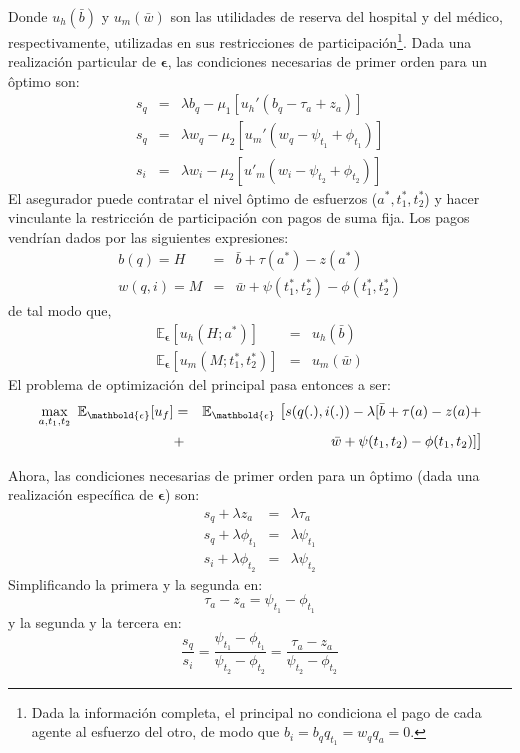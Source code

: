 ﻿\documentclass[12pt,letterpaper]{article}
\begin{document}
Donde $ u_h(\bar{b}) $ y $ u_m(\bar{w}) $ son las utilidades de reserva del hospital y del m\'edico, respectivamente, utilizadas en sus restricciones de participaci\'on\footnote{Dada la informaci\'on completa, el principal no condiciona el pago de cada agente al esfuerzo del otro, de modo que $b_i=b_qq_{t_1}=w_qq_a=0 $.}. Dada una realizaci\'on particular de $ \mathbold{\epsilon} $, las condiciones necesarias de primer orden para un \^optimo son:
\begin{eqnarray*}
  s_q &=& \lambda b_q-\mu_1[u_h'(b_q-\tau_a+z_a)]\\
  s_q&=&
\lambda w_q-\mu_2[u_m'(w_q-\psi_{t_1}+\phi_{t_1})]\\
  s_i &=& \lambda w_i-\mu_2[u'_m(w_i-\psi_{t_2}+\phi_{t_2})]
\end{eqnarray*}
El asegurador puede contratar el nivel \^optimo de esfuerzos ($ a^*,t^*_1,t^*_2$) y hacer vinculante la restricci\'on de participaci\'on con pagos de suma fija. Los pagos vendr\'ian dados por las siguientes expresiones:
\begin{eqnarray*}
b(q)= H &=& \bar{b}+\tau(a^*)-z(a^*)\\
w(q,i)=  M&=& \bar{w}+\psi(t_1^*,t_2^*)-\phi(t_1^*,t_2^*)
\end{eqnarray*}
de tal modo que,
\begin{eqnarray*}
\mathbb{E}_{\mathbold{\epsilon}}[u_h(H;a^*)]&=&u_h(\bar{b})\\
\mathbb{E}_{\mathbold{\epsilon}}[u_m(M;t^*_1,t^*_2)]&=&u_m(\bar{w})
\end{eqnarray*}
El problema de optimizaci\'on del principal pasa entonces a ser:
\begin{eqnarray*}\label{maxf05}
\nonumber    \max\limits_{a,t_1,t_2}\
\mathbb{E}_{\mathbold{\epsilon}}[u_f]&=&\mathbb{E}_{\mathbold{\epsilon}}\text{\large{
[}}s(q(.),i(.))-\lambda[\bar{b}+\tau(a)-z(a)+\\
&+&\bar{w}+\psi(t_1,t_2)- \phi(t_1,t_2)]\text{\large{]}}
\end{eqnarray*}

Ahora, las condiciones necesarias de primer orden para un \^optimo (dada una realizaci\'on espec\'ifica de $\mathbold{\epsilon}$) son:
\begin{eqnarray}
  s_q+\lambda z_a &=& \lambda\tau_a \\
  s_q+\lambda\phi_{t_1}&=& \lambda\psi_{t_1} \\
  s_i+\lambda\phi_{t_2} &=& \lambda\psi_{t_2}
\end{eqnarray}
Simplificando la primera y la segunda en:
\begin{equation}\label{cpo1}
    \tau_a-z_a=\psi_{t_1}-\phi_{t_1}
\end{equation}
y la segunda y la tercera en:
\begin{equation}\label{cpo2}
\frac{s_q}{s_i}=\frac{\psi_{t_1}-\phi_{t_1}}{\psi_{t_2}-\phi_{t_2}}=\frac{\tau_a-z_a}{\psi_{t_2}-\phi_{t_2}}
\end{equation}
\end{document}
